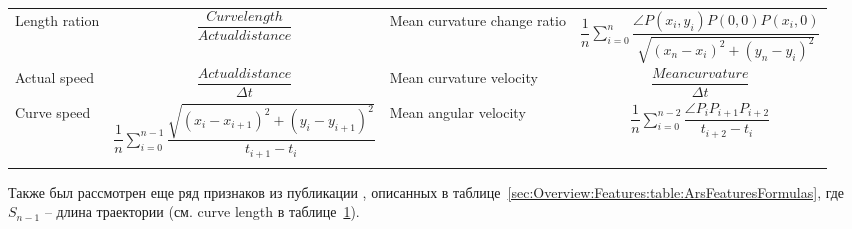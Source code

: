 \documentclass[12pt]{article}
\begin{document}
\begin{table}[h]
\begin{tabular}[c]{ || m{20mm} | c || m{20mm} | c ||}
            \hhline{||-|-||-|-||}
            Length ration & {\centering $ \dfrac{Curvelength}{Actualdistance} $} &
            Mean curvature change ratio & {\centering $ \dfrac{1}{n} \sum\limits_{i=0}^{n} \dfrac{\angle P(x_i, y_i)P(0,0)P(x_i, 0)}{\sqrt{(x_n-x_i)^2 + (y_n-y_i)^2}} $} \\
            \hhline{||-|-||-|-||}
            Actual speed & {\centering $ \dfrac{Actualdistance}{\Delta t} $} &
            Mean curvature velocity & {\centering $ \dfrac{Meancurvature}{\Delta t} $} \\
            \hhline{||-|-||-|-||}
            Curve speed & {\centering $ \dfrac{1}{n} \sum\limits_{i=0}^{n-1} \dfrac{\sqrt{(x_i-x_{i+1})^2 + (y_i-y_{i+1})^2}}{t_{i+1} - t_i} $} &
            Mean angular velocity & {\centering $ \dfrac{1}{n} \sum\limits_{i=0}^{n-2} \dfrac{\angle P_i P_{i+1} P_{i+2}}{t_{i+2} - t_i} $} \\
            \hhline{|b:==:b:==:b|} 
        \end{tabular}
        \label{sec:Overview:Features:table:FeaturesFormulas}
    \end{table}

    \par Также был рассмотрен еще ряд признаков из публикации \cite{ArsFeature}, описанных в таблице~\ref{sec:Overview:Features:table:ArsFeaturesFormulas}, где $S_{n-1}$ -- длина траектории (см. curve length в таблице~\ref{sec:Overview:Features:table:FeaturesFormulas}).
\end{document}
